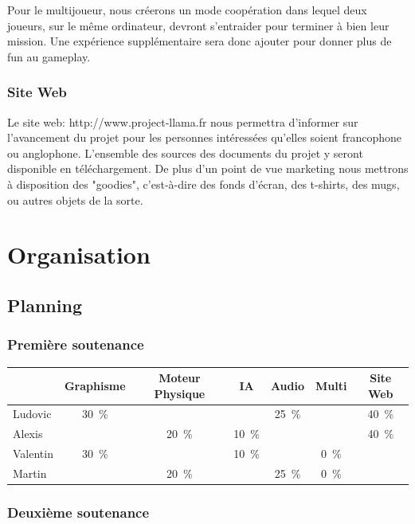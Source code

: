 \documentclass[12pt,a4paper]{article}
\begin{document}
Pour le multijoueur, nous créerons un mode coopération dans lequel deux joueurs, sur le même ordinateur, devront s'entraider pour terminer à bien leur mission. Une expérience supplémentaire sera donc ajouter pour donner plus de fun au gameplay.

\subsubsection{Site Web}

Le site web: http://www.project-llama.fr nous permettra d'informer sur l'avancement du projet pour les personnes intéressées qu'elles soient francophone ou anglophone. L'ensemble des sources des documents du projet y seront disponible en téléchargement. De plus d'un point de vue marketing nous mettrons à disposition des "goodies", c'est-à-dire des fonds d'écran, des t-shirts, des mugs, ou autres objets de la sorte.


\newpage

\section{Organisation}

     
      \subsection{Planning}
            \subsubsection{Première soutenance}
 \begin{tabular}{|l|c|c|c|c|c|c|}
            \hline
                             & Graphisme & Moteur Physique & IA & Audio & Multi & Site Web \\ \hline
            Ludovic        &   30~\%   & &   & 25~\%& &  40~\% \\ \hline
            Alexis           &       &  20~\%   &   10~\% &  &    &  40~\%   \\ \hline
            Valentin        &   30~\%     &   &10~\%  & &   0~\%  &             \\ \hline
           Martin           &      &        20~\%    & &  25~\%  &0~\%  &    \\ \hline
            
        \end{tabular}

            \subsubsection{Deuxième soutenance}
\end{document}
